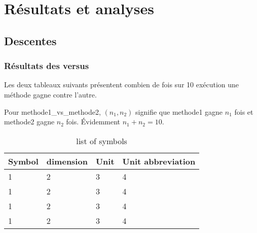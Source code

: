 \section{Résultats et analyses}

\subsection{Descentes}
\subsubsection{Résultats des versus}
Les deux tableaux suivants présentent combien de fois sur 10 exécution une méthode gagne contre l'autre. 

Pour methode1\_vs\_methode2, $(n_1,n_2)$ signifie que methode1 gagne $n_1$ fois et methode2 gagne $n_2$ fois. Évidemment $n_1+n_2=10$.
\iffalse
\begin{table}[ht]
	\centering
	\caption{list of symbols}
	\begin{tabular}[t]
		{m{}m{}m{}m{}}
		\toprule
		\textbf{Symbol}&\textbf{dimension}&\textbf{Unit}&\textbf{Unit abbreviation}\\
		\midrule
		1&2&3&4\\
		1&2&3&4\\
		1&2&3&4\\
		1&2&3&4\\
		\bottomrule
	\end{tabular}

\end{table}


